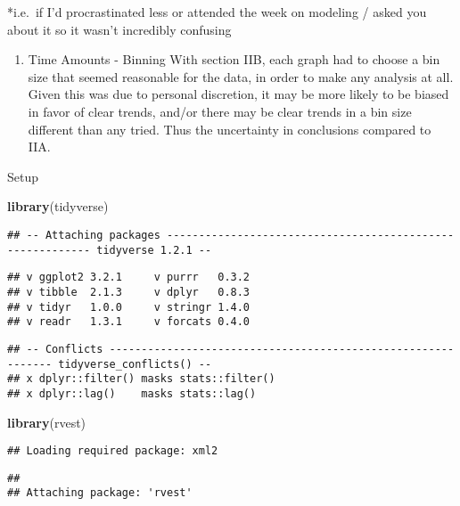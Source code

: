 \documentclass[]{article}
\newenvironment{Shaded}{\begin{snugshade}}{\end{snugshade}}
\newcommand{\KeywordTok}[1]{\textcolor[rgb]{0.13,0.29,0.53}{\textbf{#1}}}
\newcommand{\NormalTok}[1]{#1}
\providecommand{\tightlist}{%
  \setlength{\itemsep}{0pt}\setlength{\parskip}{0pt}}
\begin{document}
*i.e.~if I'd procrastinated less or attended the week on modeling /
asked you about it so it wasn't incredibly confusing

\begin{enumerate}
\def\labelenumi{\alph{enumi}.}
\setcounter{enumi}{1}
\tightlist
\item
  Time Amounts - Binning With section IIB, each graph had to choose a
  bin size that seemed reasonable for the data, in order to make any
  analysis at all. Given this was due to personal discretion, it may be
  more likely to be biased in favor of clear trends, and/or there may be
  clear trends in a bin size different than any tried. Thus the
  uncertainty in conclusions compared to IIA.
\end{enumerate}

Setup

\begin{Shaded}
\begin{Highlighting}[]
\KeywordTok{library}\NormalTok{(tidyverse)}
\end{Highlighting}
\end{Shaded}

\begin{verbatim}
## -- Attaching packages ---------------------------------------------------------- tidyverse 1.2.1 --
\end{verbatim}

\begin{verbatim}
## v ggplot2 3.2.1     v purrr   0.3.2
## v tibble  2.1.3     v dplyr   0.8.3
## v tidyr   1.0.0     v stringr 1.4.0
## v readr   1.3.1     v forcats 0.4.0
\end{verbatim}

\begin{verbatim}
## -- Conflicts ------------------------------------------------------------- tidyverse_conflicts() --
## x dplyr::filter() masks stats::filter()
## x dplyr::lag()    masks stats::lag()
\end{verbatim}

\begin{Shaded}
\begin{Highlighting}[]
\KeywordTok{library}\NormalTok{(rvest)}
\end{Highlighting}
\end{Shaded}

\begin{verbatim}
## Loading required package: xml2
\end{verbatim}

\begin{verbatim}
## 
## Attaching package: 'rvest'
\end{verbatim}
\end{document}
